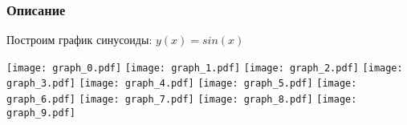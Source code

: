 \documentclass[8pt,xcolor=pdftex,dvipsnames,table]{beamer}
\begin{document}
\begin{frame}
\transdissolve[duration=0.2]
\titlepage
\end{frame}

\begin{frame}
\frametitle{Описание}

Построим график синусоиды: 
$y(x)=sin(x)$


\end{frame}

\begin{frame}
\begin{animateinline}{10}
\texttt{[image: graph\_0.pdf]}
\newframe
\texttt{[image: graph\_1.pdf]}
\newframe
\texttt{[image: graph\_2.pdf]}
\newframe
\texttt{[image: graph\_3.pdf]}
\newframe
\texttt{[image: graph\_4.pdf]}
\newframe
\texttt{[image: graph\_5.pdf]}
\newframe
\texttt{[image: graph\_6.pdf]}
\newframe
\texttt{[image: graph\_7.pdf]}
\newframe
\texttt{[image: graph\_8.pdf]}
\newframe
\texttt{[image: graph\_9.pdf]}
\newframe
\end{animateinline}

\end{frame}

\end{document}
